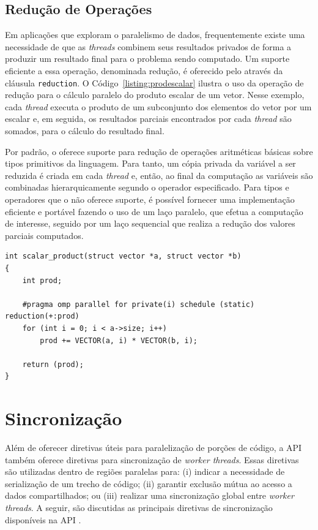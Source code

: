 \documentclass{SBCbookchapter}
\begin{document}
	\subsection{Redução de Operações}
	\label{subsection: reducao de operacoes}

		Em aplicações que exploram o paralelismo de dados,
		frequentemente existe uma necessidade de que as \textit{threads}
		combinem seus resultados privados de forma a produzir um
		resultado final para o problema sendo computado. Um suporte
		eficiente a essa operação, denominada redução, é oferecido pelo
		\openmp através da cláusula \texttt{reduction}. O Código~\ref{listing:prodescalar}
		ilustra o uso da operação de redução para o cálculo
		paralelo do produto escalar de um vetor. Nesse exemplo, cada
		\textit{thread} executa o produto de um subconjunto dos
		elementos do vetor por um escalar e, em seguida, os resultados
		parciais encontrados por cada \textit{thread} são somados, para
		o cálculo do resultado final.

		Por padrão, o \openmp oferece suporte  para redução de operações
		aritméticas básicas sobre tipos primitivos da linguagem. Para
		tanto, um cópia privada da variável a ser reduzida é criada em
		cada \textit{thread} e, então, ao final da computação as
		variáveis são combinadas hierarquicamente segundo o operador
		especificado. Para tipos e operadores que o \openmp não oferece
		suporte, é possível fornecer uma implementação eficiente e
		portável fazendo o uso de um laço paralelo, que efetua a
		computação de interesse, seguido por um laço sequencial que
		realiza a redução dos valores parciais computados.

\begin{lstlisting}[frame=single, caption=Produto escalar.,
label=listing:prodescalar]
int scalar_product(struct vector *a, struct vector *b)
{
	int prod;

	#pragma omp parallel for private(i) schedule (static) reduction(+:prod)
	for (int i = 0; i < a->size; i++)
		prod += VECTOR(a, i) * VECTOR(b, i);
	
	return (prod);
}
\end{lstlisting}


\section{Sincronização}
\label{section: sincronizacao}

	Além de oferecer diretivas úteis para paralelização de porções de código, a API
	\openmp também oferece diretivas para sincronização de \textit{worker threads}. Essas
	diretivas são utilizadas dentro de regiões paralelas para: (i) indicar a necessidade de serialização
	de um trecho de código; (ii) garantir exclusão mútua ao acesso a dados compartilhados; ou
	(iii) realizar uma sincronização global entre \textit{worker threads}. A seguir, são discutidas
	as principais diretivas de sincronização disponíveis na API \openmp.
\end{document}
